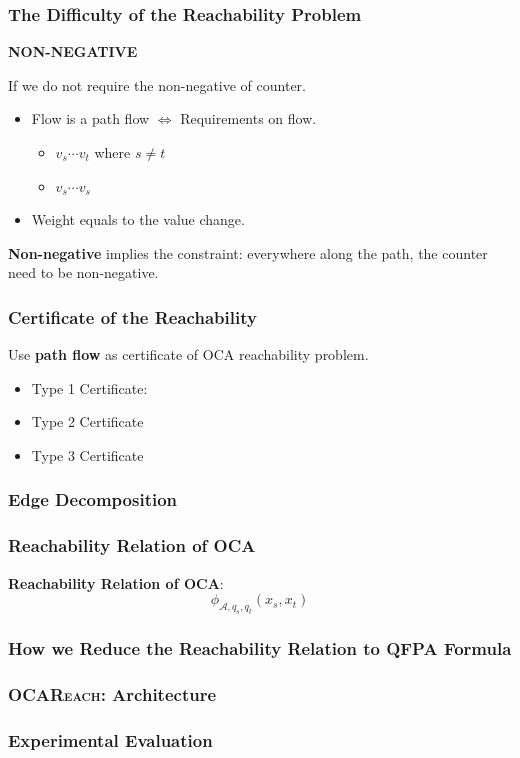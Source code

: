 \documentclass[11pt]{beamer}
\begin{document}
\begin{frame}\frametitle{The Difficulty of the Reachability Problem}
\begin{center}
\large
\textbf{NON-NEGATIVE}
\end{center}
If we do not require the non-negative of counter.

\begin{itemize}
\item Flow is a path flow $\Leftrightarrow$ Requirements on flow.
\begin{itemize}
\item $v_s\cdots v_t$ where $s \ne t$

\item $v_s\cdots v_s$
\end{itemize}
\item Weight equals to the value change.
\end{itemize}

\textbf{Non-negative} implies the constraint:
everywhere along the path, the counter need to be non-negative.
\end{frame}

\begin{frame}\frametitle{Certificate of the Reachability}

Use \textbf{path flow} as certificate of OCA reachability problem.

\begin{itemize}
\item Type 1 Certificate: 

\item Type 2 Certificate

\item Type 3 Certificate
\end{itemize}


\end{frame}


\begin{frame}\frametitle{Edge Decomposition}

\end{frame}


\begin{frame}\frametitle{Reachability Relation of OCA}

\textbf{Reachability Relation of OCA}: 
\[\phi_{{\mathcal{A}}, q_s, q_t}(x_s, x_t)\]

\end{frame}


	

\begin{frame}\frametitle{How we Reduce the Reachability Relation to QFPA Formula}

\end{frame}

\begin{frame}\frametitle{\textsc{OCAReach}: Architecture}

\end{frame}

\begin{frame}\frametitle{Experimental Evaluation}

\end{frame}
\end{document}
